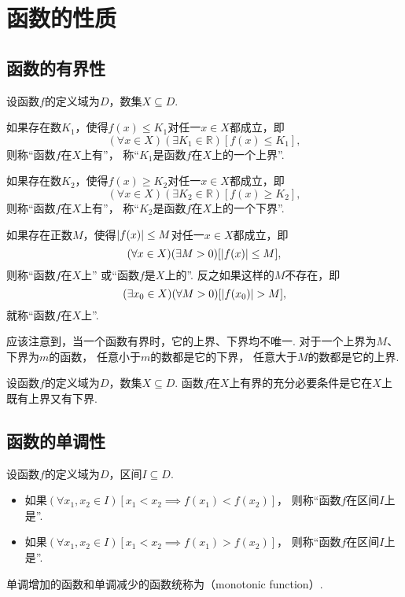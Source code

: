 \section{函数的性质}
\subsection{函数的有界性}
\begin{definition}\label{definition:函数.函数的有界性}
设函数\(f\)的定义域为\(D\)，数集\(X \subseteq D\).

如果存在数\(K_1\)，使得\(f(x) \leq K_1\)对任一\(x \in X\)都成立，即\[
	(\forall x \in X)
	(\exists K_1 \in \mathbb{R})
	[f(x) \leq K_1],
\]
则称“函数\(f\)在\(X\)上有”，
称“\(K_1\)是函数\(f\)在\(X\)上的一个上界”.

如果存在数\(K_2\)，使得\(f(x) \geq K_2\)对任一\(x \in X\)都成立，即\[
	(\forall x \in X)
	(\exists K_2 \in \mathbb{R})
	[f(x) \geq K_2],
\]
则称“函数\(f\)在\(X\)上有”，
称“\(K_2\)是函数\(f\)在\(X\)上的一个下界”.

如果存在正数\(M\)，使得\(\abs{f(x)} \leq M\)对任一\(x \in X\)都成立，即\[
	(\forall x \in X)
	(\exists M>0)[
		\abs{f(x)} \leq M
	],
\]
则称“函数\(f\)在\(X\)上”
或“函数\(f\)是\(X\)上的”.
反之如果这样的\(M\)不存在，即\[
	(\exists x_0 \in X)
	(\forall M>0)[
		\abs{f(x_0)} > M
	],
\]
就称“函数\(f\)在\(X\)上”.
\end{definition}

应该注意到，当一个函数有界时，它的上界、下界均不唯一.
对于一个上界为\(M\)、下界为\(m\)的函数，
任意小于\(m\)的数都是它的下界，
任意大于\(M\)的数都是它的上界.

\begin{theorem}
设函数\(f\)的定义域为\(D\)，数集\(X \subseteq D\).
函数\(f\)在\(X\)上有界的充分必要条件是它在\(X\)上既有上界又有下界.
\end{theorem}

\subsection{函数的单调性}
\begin{definition}
设函数\(f\)的定义域为\(D\)，区间\(I \subseteq D\).
\begin{itemize}
	\item 如果\((\forall x_1,x_2\in I)
	[x_1 < x_2 \implies f(x_1) < f(x_2)]\)，
	则称“函数\(f\)在区间\(I\)上是”.

	\item 如果\((\forall x_1,x_2\in I)
	[x_1 < x_2 \implies f(x_1) > f(x_2)]\)，
	则称“函数\(f\)在区间\(I\)上是”.
\end{itemize}

单调增加的函数和单调减少的函数统称为（monotonic function）.
\end{definition}

